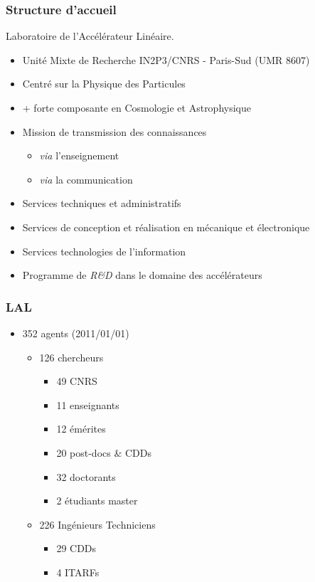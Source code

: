 \documentclass[bigger]{beamer}
\begin{document}
\begin{frame}
\frametitle{Structure d'accueil}
\label{sec-1-2}


Laboratoire de l'Acc\'el\'erateur Lin\'eaire.

\begin{itemize}
\item Unit\'e Mixte de Recherche IN2P3/CNRS - Paris-Sud (UMR 8607)
\item Centr\'e sur la Physique des Particules
\item + forte composante en Cosmologie et Astrophysique
\item Mission de transmission des connaissances
\begin{itemize}
\item \emph{via} l'enseignement
\item \emph{via} la communication
\end{itemize}
\item Services techniques et administratifs
\item Services de conception et r\'ealisation en m\'ecanique et
  \'electronique
\item Services technologies de l'information
\item Programme de \emph{R\&D} dans le domaine des acc\'el\'erateurs
\end{itemize}
\end{frame}
\begin{frame}
\frametitle{LAL}
\label{sec-1-3}


\begin{itemize}
\item 352 agents (2011/01/01)
\begin{itemize}
\item 126 chercheurs
\begin{itemize}
\item 49 CNRS
\item 11 enseignants
\item 12 \'em\'erites
\item 20 post-docs \& CDDs
\item 32 doctorants
\item 2 \'etudiants master
\end{itemize}
\item 226 Ing\'enieurs Techniciens
\begin{itemize}
\item 29 CDDs
\item 4 ITARFs
\end{itemize}
\end{itemize}
\end{itemize}
\end{frame}
\end{document}
